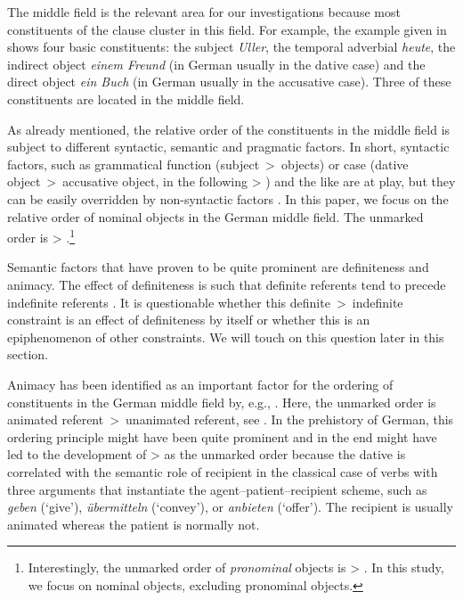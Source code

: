 \documentclass[output=paper,colorlinks,citecolor=brown]{langscibook}
\begin{document}
The middle field is the relevant area for our investigations because most constituents of the clause cluster in this field. For example, the example given in  shows four basic constituents: the subject \emph{Uller}, the temporal adverbial \emph{heute}, the indirect object \emph{einem Freund} (in German usually in the dative case) and the direct object \emph{ein Buch} (in German usually in the accusative case). Three of these constituents are located in the middle field.

As already mentioned, the relative order of the constituents in the middle field is subject to different syntactic, semantic and pragmatic factors. In short, syntactic factors, such as grammatical function (subject~>~objects) or case (dative object~>~accusative object, in the following \ReichDat{} > \ReichAcc{}) and the like are at play, but they can be easily overridden by non-syntactic factors \citep[cf.\ the seminal study by][]{lenerz77}. In this paper, we focus on the relative order of nominal objects in the German middle field. The unmarked order is \ReichDat{} > \ReichAcc{} \citep[][]{lenerz77}.\footnote{Interestingly, the unmarked order of \emph{pronominal} objects is \ReichAcc{} > \ReichDat{}. In this study, we focus on nominal objects, excluding pronominal objects.}

Semantic factors that have proven to be quite prominent are definiteness and animacy. The effect of definiteness is such that definite referents tend to precede indefinite referents \citep{lenerz77}. It is questionable whether this definite~>~indefinite constraint is an effect of definiteness by itself or whether this is an epiphenomenon of other constraints. We will touch on this question later in this section. 

Animacy has been identified as an important factor for the ordering of constituents in the German middle field by, e.g., \citet{Hoberg.1981}. Here, the unmarked order is animated referent~>~unanimated referent, see . In the prehistory of German, this ordering principle might have been quite prominent and in the end might have led to the development of \ReichDat{} > \ReichAcc{} as the unmarked order \citep[see][]{speyer15} because the dative is correlated with the semantic role of recipient in the classical case of verbs with three arguments that instantiate the agent--patient--recipient scheme, such as \emph{geben} (`give'), \emph{übermitteln} (`convey'), or \emph{anbieten} (`offer'). The recipient is usually animated whereas the patient is normally not.\largerpage
\end{document}
